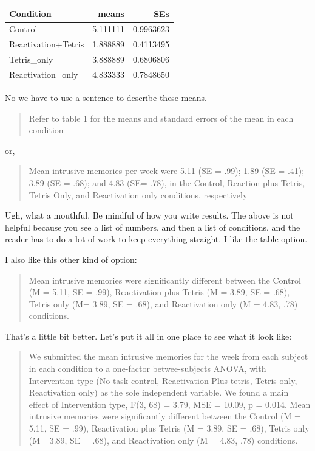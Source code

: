 \documentclass[]{book}
\theoremstyle{definition}
\theoremstyle{definition}
\theoremstyle{definition}
\theoremstyle{remark}
\begin{document}
\begin{tabular}{l|r|r}
\hline
Condition & means & SEs\\
\hline
Control & 5.111111 & 0.9963623\\
\hline
Reactivation+Tetris & 1.888889 & 0.4113495\\
\hline
Tetris\_only & 3.888889 & 0.6806806\\
\hline
Reactivation\_only & 4.833333 & 0.7848650\\
\hline
\end{tabular}

No we have to use a sentence to describe these means.

\begin{quote}
Refer to table 1 for the means and standard errors of the mean in each
condition
\end{quote}

or,

\begin{quote}
Mean intrusive memories per week were 5.11 (SE = .99); 1.89 (SE = .41);
3.89 (SE = .68); and 4.83 (SE= .78), in the Control, Reaction plus
Tetris, Tetris Only, and Reactivation only conditions, respectively
\end{quote}

Ugh, what a mouthful. Be mindful of how you write results. The above is
not helpful because you see a list of numbers, and then a list of
conditions, and the reader has to do a lot of work to keep everything
straight. I like the table option.

I also like this other kind of option:

\begin{quote}
Mean intrusive memories were significantly different between the Control
(M = 5.11, SE = .99), Reactivation plus Tetris (M = 3.89, SE = .68),
Tetris only (M= 3.89, SE = .68), and Reactivation only (M = 4.83, .78)
conditions.
\end{quote}

That's a little bit better. Let's put it all in one place to see what it
look like:

\begin{quote}
We submitted the mean intrusive memories for the week from each subject
in each condition to a one-factor betwee-subjects ANOVA, with
Intervention type (No-task control, Reactivation Plus tetris, Tetris
only, Reactivation only) as the sole independent variable. We found a
main effect of Intervention type, F(3, 68) = 3.79, MSE = 10.09, p =
0.014. Mean intrusive memories were significantly different between the
Control (M = 5.11, SE = .99), Reactivation plus Tetris (M = 3.89, SE =
.68), Tetris only (M= 3.89, SE = .68), and Reactivation only (M = 4.83,
.78) conditions.
\end{quote}
\end{document}
